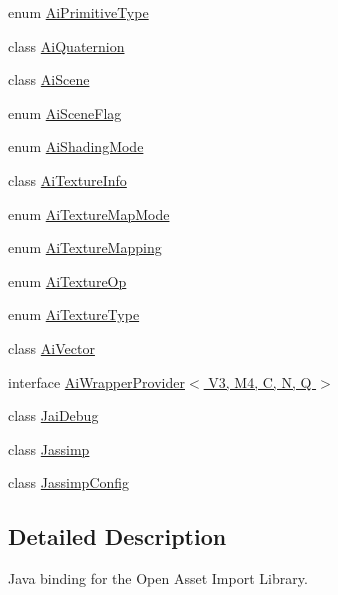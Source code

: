\begin{DoxyCompactItemize}
\item 
enum \hyperlink{enumjassimp_1_1_ai_primitive_type}{Ai\+Primitive\+Type}
\item 
class \hyperlink{classjassimp_1_1_ai_quaternion}{Ai\+Quaternion}
\item 
class \hyperlink{classjassimp_1_1_ai_scene}{Ai\+Scene}
\item 
enum \hyperlink{enumjassimp_1_1_ai_scene_flag}{Ai\+Scene\+Flag}
\item 
enum \hyperlink{enumjassimp_1_1_ai_shading_mode}{Ai\+Shading\+Mode}
\item 
class \hyperlink{classjassimp_1_1_ai_texture_info}{Ai\+Texture\+Info}
\item 
enum \hyperlink{enumjassimp_1_1_ai_texture_map_mode}{Ai\+Texture\+Map\+Mode}
\item 
enum \hyperlink{enumjassimp_1_1_ai_texture_mapping}{Ai\+Texture\+Mapping}
\item 
enum \hyperlink{enumjassimp_1_1_ai_texture_op}{Ai\+Texture\+Op}
\item 
enum \hyperlink{enumjassimp_1_1_ai_texture_type}{Ai\+Texture\+Type}
\item 
class \hyperlink{classjassimp_1_1_ai_vector}{Ai\+Vector}
\item 
interface \hyperlink{interfacejassimp_1_1_ai_wrapper_provider_3_01_v3_00_01_m4_00_01_c_00_01_n_00_01_q_01_4}{Ai\+Wrapper\+Provider$<$ V3, M4, C, N, Q $>$}
\item 
class \hyperlink{classjassimp_1_1_jai_debug}{Jai\+Debug}
\item 
class \hyperlink{classjassimp_1_1_jassimp}{Jassimp}
\item 
class \hyperlink{classjassimp_1_1_jassimp_config}{Jassimp\+Config}
\end{DoxyCompactItemize}


\subsection{Detailed Description}
Java binding for the Open Asset Import Library. 